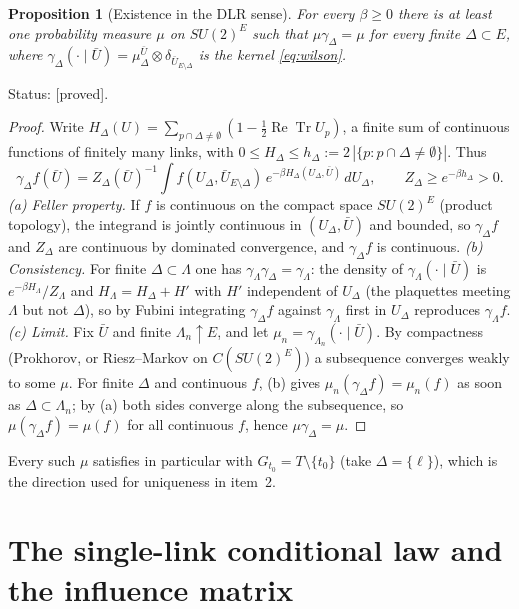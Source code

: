 \documentclass[11pt,a4paper]{article}
\newtheorem{proposition}[theorem]{Proposition}
\theoremstyle{remark}
\theoremstyle{definition}
\newcommand{\ReTr}{\operatorname{Re}\operatorname{Tr}}
\newcommand{\st}[1]{\textsf{[#1]}}
\begin{document}
\begin{proposition}[Existence in the DLR sense]\label{prop:exist}
For every $\beta\ge0$ there is at least one probability measure $\mu$ on $SU(2)^E$ such that
$\mu\gamma_\Delta=\mu$ for every finite $\Delta\subset E$, where $\gamma_\Delta(\cdot\mid\bar U)=
\mu^{\bar U}_\Delta\otimes\delta_{\bar U_{E\setminus\Delta}}$ is the kernel \eqref{eq:wilson}.
\end{proposition}
\noindent Status: \st{proved}.
\begin{proof}
Write $H_\Delta(U)=\sum_{p\cap\Delta\ne\emptyset}(1-\tfrac12\ReTr U_p)$, a finite sum of continuous functions of
finitely many links, with $0\le H_\Delta\le h_\Delta:=2\,|\{p:p\cap\Delta\ne\emptyset\}|$. Thus
\[
\gamma_\Delta f(\bar U)=Z_\Delta(\bar U)^{-1}\int f(U_\Delta,\bar U_{E\setminus\Delta})\,e^{-\beta H_\Delta(U_\Delta,\bar U)}\,dU_\Delta,
\qquad Z_\Delta\ge e^{-\beta h_\Delta}>0 .
\]
\emph{(a) Feller property.} If $f$ is continuous on the compact space $SU(2)^E$ (product topology), the
integrand is jointly continuous in $(U_\Delta,\bar U)$ and bounded, so $\gamma_\Delta f$ and $Z_\Delta$ are
continuous by dominated convergence, and $\gamma_\Delta f$ is continuous.
\emph{(b) Consistency.} For finite $\Delta\subset\Lambda$ one has $\gamma_\Lambda\gamma_\Delta=\gamma_\Lambda$: the density of
$\gamma_\Lambda(\cdot\mid\bar U)$ is $e^{-\beta H_\Lambda}/Z_\Lambda$ and $H_\Lambda=H_\Delta+H'$ with $H'$ independent of
$U_\Delta$ (the plaquettes meeting $\Lambda$ but not $\Delta$), so by Fubini integrating $\gamma_\Delta f$ against
$\gamma_\Lambda$ first in $U_\Delta$ reproduces $\gamma_\Lambda f$.
\emph{(c) Limit.} Fix $\bar U$ and finite $\Lambda_n\uparrow E$, and let $\mu_n=\gamma_{\Lambda_n}(\cdot\mid\bar U)$. By
compactness (Prokhorov, or Riesz--Markov on $C(SU(2)^E)$) a subsequence converges weakly to some $\mu$.
For finite $\Delta$ and continuous $f$, (b) gives $\mu_n(\gamma_\Delta f)=\mu_n(f)$ as soon as
$\Delta\subset\Lambda_n$; by (a) both sides converge along the subsequence, so $\mu(\gamma_\Delta f)=\mu(f)$ for all
continuous $f$, hence $\mu\gamma_\Delta=\mu$.
\end{proof}
Every such $\mu$ satisfies in particular \cite[(1.3)]{Dob70} with $G_{t_0}=T\setminus\{t_0\}$ (take $\Delta=\{\ell\}$),
which is the direction used for uniqueness in item~2.

\section{The single-link conditional law and the influence matrix}\label{sec:influence}
\end{document}

